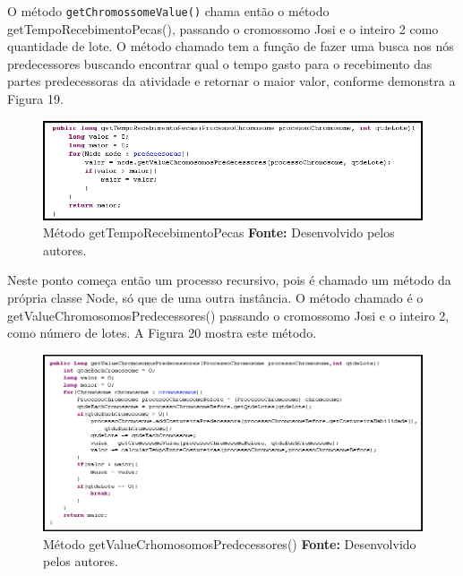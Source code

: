 \par O método \texttt{getChromossomeValue()} chama então o método getTempoRecebimentoPecas(), passando o cromossomo Josi e 
o inteiro 2 como quantidade de lote. O método chamado tem a função de fazer uma busca nos nós predecessores buscando encontrar 
qual o tempo gasto para o recebimento das partes predecessoras da atividade e retornar o maior valor, conforme demonstra a Figura 19.

\begin{figure}[h!]
	\centerline{\includegraphics[scale=0.8]{./imagens/metodo_getTempoRecebimentoPecas.png}}
	\caption[Distribuição de trabalho]
	{Método getTempoRecebimentoPecas \textbf{Fonte:} Desenvolvido pelos autores.}
	\label{fig:exemplo1}
\end{figure}

\newpage

\par Neste ponto começa então um processo recursivo, pois é chamado um método da
própria classe Node, só que de uma outra instância.
O método chamado é o getValueChromosomosPredecessores() passando o cromossomo
Josi e o inteiro 2, como número de lotes.
A Figura 20 mostra este método.

\begin{figure}[h!]
	\centerline{\includegraphics[scale=0.7]{./imagens/metodo_getValueCrhomosomosPredecessores.png}}
	\caption[Distribuição de trabalho]
	{Método getValueCrhomosomosPredecessores() \textbf{Fonte:} Desenvolvido pelos
	autores.}
	\label{fig:exemplo1}
\end{figure}

